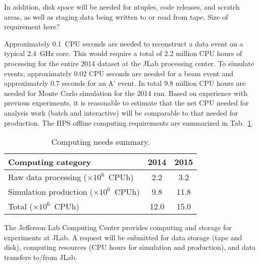 In addition, disk space will be 
needed for ntuples, code releases, and scratch areas, as well as staging data being written to or read from tape. {\color{red} Size of requirement here?}

Approximately 0.1~CPU seconds are needed to reconstruct a data event on 
a typical 2.4~GHz core. This would require a total of 2.2 million CPU hours of processing for the 
entire 2014 dataset at the JLab processing center.  To simulate events, approximately 0.02 CPU seconds 
are needed for a beam event and approximately 0.7 seconds for an A' event. In total 9.8 million CPU hours are needed for Monte Carlo 
simulation for the 2014 run. 
Based on experience with previous experiments, it is reasonable to estimate that the net CPU needed for 
analysis work (batch and interactive) will be comparable to that needed for production. 
The HPS offline computing requirements 
are summarized in Tab.~\ref{tab:computing}.
\begin{table}[tbp]
\centering
\begin{tabular}{|l|c|c|}
\hline
Computing category & 2014& 2015 \\
\hline
Raw data processing ($\times 10^{6}$~CPUh)  & 2.2 & 3.2 \\
Simulation production ($\times 10^{6}$~CPUh) & 9.8 & 11.8 \\
\hline
Total ($\times 10^{6}$~CPUh) & 12.0 & 15.0 \\
\hline
\end{tabular}
\caption{{\small Computing needs summary.}}
\label{tab:computing}
\end{table}

The Jefferson Lab Computing Center provides computing and storage for experiments at JLab. 
A request will be submitted for data storage (tape and disk), computing resources (CPU hours for simulation and production), and data transfers to/from JLab.
